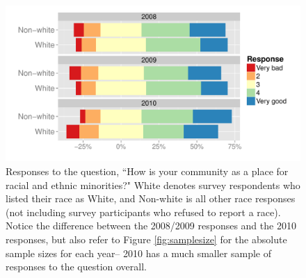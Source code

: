 \documentclass[smallextended]{svjour3}\usepackage[]{graphicx}\usepackage[]{color}
\newenvironment{knitrout}{}{} %
\begin{document}
\begin{knitrout}
\color{fgcolor}\begin{figure}

{\centering \includegraphics[width=0.99\linewidth]{figure/overallRaceResponsePlot-1} 

}

\caption{Responses to the question, ``How is your community as a place for racial and ethnic minorities?" White denotes survey respondents who listed their race as White, and Non-white is all other race responses (not including survey participants who refused to report a race). Notice the difference between the 2008/2009 responses and the 2010 responses, but also refer to Figure \ref{fig:samplesize} for the absolute sample sizes for each year-- 2010 has a much smaller sample of responses to the question overall.}\label{fig:overallRaceResponsePlot}
\end{figure}


\end{knitrout}
\end{document}
